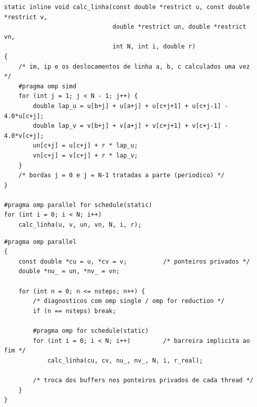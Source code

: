 \documentclass[a4paper,12pt]{article}
\begin{document}
\begin{lstlisting}[style=cstyle, caption={Versão 3: miolo sem condicionais e SIMD.}]
static inline void calc_linha(const double *restrict u, const double *restrict v,
                              double *restrict un, double *restrict vn,
                              int N, int i, double r)
{
    /* im, ip e os deslocamentos de linha a, b, c calculados uma vez */
    #pragma omp simd
    for (int j = 1; j < N - 1; j++) {
        double lap_u = u[b+j] + u[a+j] + u[c+j+1] + u[c+j-1] - 4.0*u[c+j];
        double lap_v = v[b+j] + v[a+j] + v[c+j+1] + v[c+j-1] - 4.0*v[c+j];
        un[c+j] = u[c+j] + r * lap_u;
        vn[c+j] = v[c+j] + r * lap_v;
    }
    /* bordas j = 0 e j = N-1 tratadas a parte (periodico) */
}

#pragma omp parallel for schedule(static)
for (int i = 0; i < N; i++)
    calc_linha(u, v, un, vn, N, i, r);
\end{lstlisting}

\begin{lstlisting}[style=cstyle, caption={Versão 4: região paralela única (esqueleto).}]
#pragma omp parallel
{
    const double *cu = u, *cv = v;          /* ponteiros privados */
    double *nu_ = un, *nv_ = vn;

    for (int n = 0; n <= nsteps; n++) {
        /* diagnosticos com omp single / omp for reduction */
        if (n == nsteps) break;

        #pragma omp for schedule(static)
        for (int i = 0; i < N; i++)         /* barreira implicita ao fim */
            calc_linha(cu, cv, nu_, nv_, N, i, r_real);

        /* troca dos buffers nos ponteiros privados de cada thread */
    }
}
\end{lstlisting}
\end{document}
